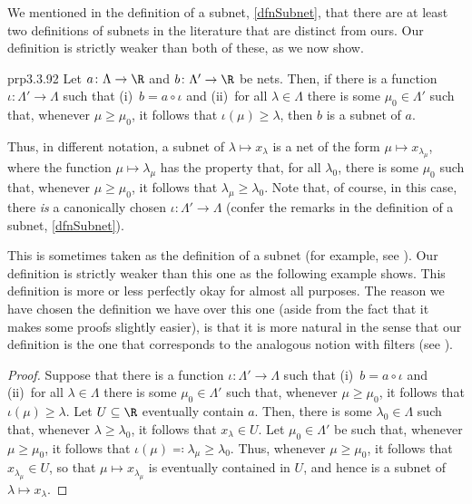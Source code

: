 We mentioned in the definition of a subnet, \cref{dfnSubnet}, that there are at least two definitions of subnets in the literature that are distinct from ours.  Our definition is strictly weaker than both of these, as we now show.
\begin{prp}{}{prp3.3.92}
Let $a\colon \Lambda \rightarrow \R$ and $b\colon \Lambda '\rightarrow \R$ be nets.  Then, if there is a function $\iota \colon \Lambda '\rightarrow \Lambda$ such that (i)~$b=a\circ \iota$ and (ii)~for all $\lambda \in \Lambda$ there is some $\mu _0\in \Lambda '$ such that, whenever $\mu \geq \mu _0$, it follows that $\iota (\mu )\geq \lambda$, then $b$ is a subnet of $a$.
\begin{rmk}
Thus, in different notation, a subnet of $\lambda \mapsto x_\lambda$ is a net of the form $\mu \mapsto x_{\lambda _\mu}$, where the function $\mu \mapsto \lambda _\mu$ has the property that, for all $\lambda _0$, there is some $\mu _0$ such that, whenever $\mu \geq \mu _0$, it follows that $\lambda _\mu \geq \lambda _0$.  Note that, of course, in this case, there \emph{is} a canonically chosen $\iota :\Lambda '\rightarrow \Lambda $ (confer the remarks in the definition of a subnet, \cref{dfnSubnet}).
\end{rmk}
\begin{rmk}
This is sometimes taken as the definition of a subnet (for example, see \cite[pg.~70]{Kelley}).  Our definition is strictly weaker than this one as the following example shows.  This definition is more or less perfectly okay for almost all purposes.  The reason we have chosen the definition we have over this one (aside from the fact that it makes some proofs slightly easier), is that it is more natural in the sense that our definition is the one that corresponds to the analogous notion with filters (see ).
\end{rmk}
\begin{proof}
Suppose that there is a function $\iota :\Lambda '\rightarrow \Lambda$ such that (i)~$b=a\circ \iota$ and (ii)~for all $\lambda \in \Lambda$ there is some $\mu _0\in \Lambda '$ such that, whenever $\mu \geq \mu _0$, it follows that $\iota (\mu )\geq \lambda$. Let $U\subseteq \R$ eventually contain $a$.  Then, there is some $\lambda _0\in \Lambda$ such that, whenever $\lambda \geq \lambda _0$, it follows that $x_\lambda \in U$.  Let $\mu _0\in \Lambda '$ be such that, whenever $\mu \geq \mu _0$, it follows that $\iota (\mu )\eqqcolon \lambda _\mu \geq \lambda _0$.  Thus, whenever $\mu \geq \mu _0$, it follows that $x_{\lambda _\mu}\in U$, so that $\mu \mapsto x_{\lambda _\mu}$ is eventually contained in $U$, and hence is a subnet of $\lambda \mapsto x_\lambda$.
\end{proof}
\end{prp}
